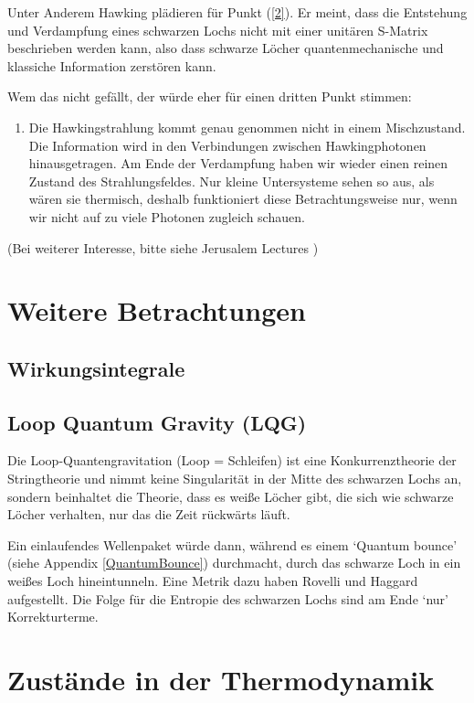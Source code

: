 \documentclass[ngerman]{scrartcl}
\begin{document}
Unter Anderem Hawking plädieren für Punkt (\ref{2}). Er meint, dass die Entstehung und Verdampfung eines schwarzen Lochs nicht mit einer unitären S-Matrix beschrieben werden kann, also dass schwarze Löcher quantenmechanische und klassiche Information zerstören kann. 

Wem das nicht gefällt, der würde eher für einen dritten Punkt stimmen:
	\begin{enumerate}[(3)]
		\item Die Hawkingstrahlung kommt genau genommen nicht in einem Mischzustand. Die Information wird in den Verbindungen zwischen Hawkingphotonen hinausgetragen. Am Ende der Verdampfung haben wir wieder einen reinen Zustand des Strahlungsfeldes. Nur kleine Untersysteme sehen so aus, als wären sie thermisch, deshalb funktioniert diese Betrachtungsweise nur, wenn wir nicht auf zu viele Photonen zugleich schauen. 
	\end{enumerate}   
(Bei weiterer Interesse, bitte siehe Jerusalem Lectures \cite{JerusalemsLectures})
	
\section{Weitere Betrachtungen}
	\subsection{Wirkungsintegrale}
	\subsection{Loop Quantum Gravity (LQG) \checkmark}	%
Die Loop-Quantengravitation (Loop = Schleifen) ist eine Konkurrenztheorie der Stringtheorie und nimmt keine Singularität in der Mitte des schwarzen Lochs an, sondern beinhaltet die Theorie, dass es weiße Löcher gibt, die sich wie schwarze Löcher verhalten, nur das die Zeit rückwärts läuft. 

Ein einlaufendes Wellenpaket würde dann, während es einem `Quantum bounce' (siehe Appendix
\ref{QuantumBounce}) durchmacht, durch das schwarze Loch in ein weißes Loch hineintunneln. Eine Metrik dazu haben Rovelli und Haggard \cite{LQGRovelli} aufgestellt. Die Folge für die Entropie des schwarzen Lochs sind am Ende `nur' Korrekturterme.


\appendix
\section{Zustände in der Thermodynamik}
\end{document}
